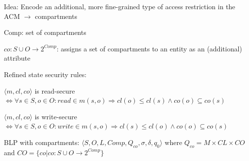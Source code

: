 \documentclass[a4paper]{article}
\begin{document}
\begin{multicols}{3}
    Idea: Encode an additional, more fine-grained type of access restriction in the ACM $\rightarrow$ compartments
    \begin{itemize*}
        \item Comp: set of compartments
        \item $co:S\cup O\rightarrow 2^{Comp}$: assigns a set of compartments to an entity as an (additional) attribute
        \item Refined state security rules:
        \begin{itemize*}
            \item $\langle m,cl,co\rangle$ is read-secure $\Leftrightarrow\forall s\in S,o\in O:read \in m(s,o)\Rightarrow cl(o)\leq cl(s)\wedge co(o) \subseteq co(s)$
            \item $\langle m,cl,co\rangle$ is write-secure $\Leftrightarrow\forall s\in S,o\in O:write\in m(s,o)\Rightarrow cl(s)\leq cl(o)\wedge co(o) \subseteq co(s)$
        \end{itemize*}
        \item BLP with compartments: $\langle S,O,L,Comp,Q_{co},\sigma,\delta,q_0\rangle$ where $Q_{co}=M\times CL\times CO$ and $CO=\{co|co:S\cup O\rightarrow 2^{Comp}\}$
    \end{itemize*}


\end{multicols}
\end{document}
